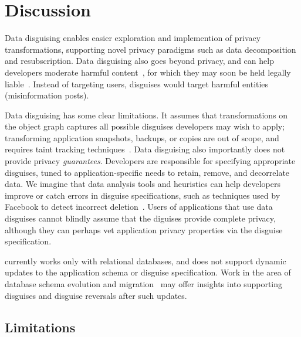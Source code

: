 \section{Discussion}
Data disguising enables easier exploration and implemention of privacy transformations, supporting
novel privacy paradigms such as data decomposition and resubscription. Data disguising also goes
beyond privacy, and can help developers moderate harmful content~\cite{contentmod, sasb}, for which they
may soon be held legally liable~\cite{nytimes:230}. Instead of targeting users, disguises  
would target harmful entities (\eg misinformation posts).

Data disguising has some clear limitations. It assumes that transformations on the object graph
captures all possible disguises developers may wish to apply; transforming application
snapshots, backups, or copies are out of scope, and requires \eg taint tracking
techniques~\cite{schengendb}. 
Data disguising also importantly does not provide privacy \emph{guarantees}. Developers are responsible for
specifying appropriate disguises, tuned to application-specific needs to retain, remove, and decorrelate
data. 
We imagine that data analysis tools and heuristics can help developers improve or catch
errors in disguise specifications, such as techniques used by Facebook to detect incorrect
deletion~\cite{delf}. Users of applications that use data disguises cannot blindly assume that the
diguises provide complete privacy, although they can perhaps vet application privacy properties via the
disguise specification.

\sys currently works only with relational databases, and does not support dynamic
updates to the application schema or disguise specification.
Work in the area of database schema evolution and migration~\cite{schema:evo} may offer insights
into supporting disguises and disguise reversals after such updates.



\iffalse
\subsection{Limitations}

